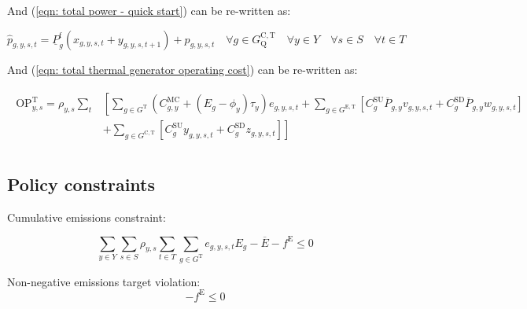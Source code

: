 \documentclass{article}
\newcommand{\sGeneratorsExistingThermal}{G^{\mathrm{E,T}}}
\newcommand{\sGeneratorsCandidateThermal}{G^{\mathrm{C,T}}}
\newcommand{\sGeneratorsThermal}{G^{\mathrm{T}}}
\newcommand{\sYears}{Y}
\newcommand{\sScenarios}{S}
\newcommand{\sIntervals}{T}
\newcommand{\sGeneratorsCandidateThermalQuickStart}{G^{\mathrm{C,T}}_\mathrm{Q}}
\newcommand{\iGenerator}{g}
\newcommand{\iYear}{y}
\newcommand{\iScenario}{s}
\newcommand{\iInterval}{t}
\newcommand{\cOperatingCostThermal}[1][\iYear,\iScenario]{\mathrm{OP}^{\mathrm{T}}_{#1}}
\newcommand{\cScenarioDuration}[1][\iYear,\iScenario]{\rho_{#1}}
\newcommand{\cMarginalCost}[1][\iGenerator,\iYear]{C^{\mathrm{MC}}_{#1}}
\newcommand{\cStartupCost}[1][\iGenerator]{C^{\mathrm{SU}}_{#1}}
\newcommand{\cShutdownCost}[1][\iGenerator]{C^{\mathrm{SD}}_{#1}}
\newcommand{\cEmissionsIntensity}[1][\iGenerator]{E_{#1}}
\newcommand{\cPowerOutputMax}[1][\iGenerator,\iYear]{\overline{P}_{#1}}
\newcommand{\cPowerOutputMin}[1][\iGenerator]{\underline{P}_{#1}}
\newcommand{\cEmmissionsCumulativeTarget}{\overline{E}}
\newcommand{\cPowerOutputMinProportion}{\cPowerOutputMin^{\mathrm{f}}}
\newcommand{\vBaseline}[1][\iYear]{\phi_{#1}}
\newcommand{\vPermitPrice}[1][\iYear]{\tau_{#1}}
\newcommand{\vEnergy}[1][\iGenerator,\iYear,\iScenario,\iInterval]{e_{#1}}
\newcommand{\vStartupIndicator}[1][\iGenerator,\iYear,\iScenario,\iInterval]{v_{#1}}
\newcommand{\vShutdownIndicator}[1][\iGenerator,\iYear,\iScenario,\iInterval]{w_{#1}}
\newcommand{\vPower}[1][\iGenerator,\iYear,\iScenario,\iInterval]{p_{#1}}
\newcommand{\vPowerTotal}[1][\iGenerator,\iYear,\iScenario,\iInterval]{\hat{p}_{#1}}
\newcommand{\vEmissionsTargetViolation}{f^{\mathrm{E}}}
\newcommand{\vInstalledCapacityOnStateAux}[1][\iGenerator,\iYear,\iScenario,\iInterval]{x_{#1}}
\newcommand{\vInstalledCapacityStartupStateAux}[1][\iGenerator,\iYear,\iScenario,\iInterval]{y_{#1}}
\newcommand{\vInstalledCapacityShutdownStateAux}[1][\iGenerator,\iYear,\iScenario,\iInterval]{z_{#1}}
\begin{document}
And (\ref{eqn: total power - quick start}) can be re-written as:

\begin{equation}
\vPowerTotal = \cPowerOutputMinProportion \left(\vInstalledCapacityOnStateAux + \vInstalledCapacityStartupStateAux[\iGenerator,\iYear,\iScenario,\iInterval+1]\right) + \vPower \quad \forall \iGenerator \in \sGeneratorsCandidateThermalQuickStart \quad \forall \iYear \in \sYears \quad \forall \iScenario \in \sScenarios \quad \forall \iInterval \in \sIntervals
\end{equation}

And (\ref{eqn: total thermal generator operating cost}) can be re-written as:

\begin{align}
\begin{split}
\cOperatingCostThermal = \cScenarioDuration\sum\limits_{\iInterval} & \left[\sum\limits_{\iGenerator \in \sGeneratorsThermal} (\cMarginalCost + (\cEmissionsIntensity - \vBaseline)\vPermitPrice)\vEnergy + \sum\limits_{\iGenerator \in \sGeneratorsExistingThermal} \left[\cStartupCost \cPowerOutputMax \vStartupIndicator + \cShutdownCost \cPowerOutputMax \vShutdownIndicator\right] \right.\\
& \left. + \sum\limits_{\iGenerator \in \sGeneratorsCandidateThermal} \left[\cStartupCost \vInstalledCapacityStartupStateAux + \cShutdownCost \vInstalledCapacityShutdownStateAux \right] \right]\\
\end{split}
\end{align}

\subsection{Policy constraints}

Cumulative emissions constraint:

\begin{equation}
\sum\limits_{\iYear \in \sYears} \sum\limits_{\iScenario \in \sScenarios} \cScenarioDuration \sum\limits_{\iInterval \in \sIntervals} \sum\limits_{\iGenerator \in \sGeneratorsThermal} \vEnergy \cEmissionsIntensity - \cEmmissionsCumulativeTarget - \vEmissionsTargetViolation \leq 0
\label{eqn: cumulative emissions target}
\end{equation}

Non-negative emissions target violation:
\begin{equation}
	-\vEmissionsTargetViolation \leq 0
	\label{eqn: non negative emissions target violation}
\end{equation}
\end{document}
